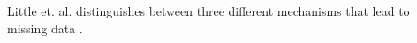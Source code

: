 Little et. al. \cite{little} distinguishes between three different mechanisms that lead to missing data \cite{little}.

